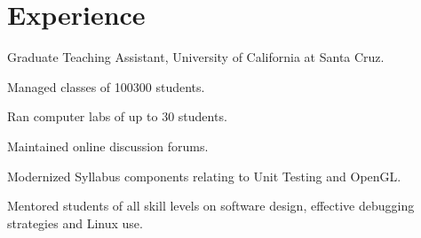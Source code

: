 \documentclass[%
]{komacv}
\begin{document}
\section{Experience}
Graduate Teaching Assistant, University of California at Santa Cruz. \
\begin{compactitem}
    \item Managed classes of 100\textendash{}300 students.
    \item Ran computer labs of up to 30 students.
    \item Maintained online discussion forums.
    \item Modernized Syllabus components relating to Unit Testing and OpenGL.
    \item Mentored students of all skill levels on software design, effective debugging strategies and Linux use.
\end{compactitem}




\end{document}

